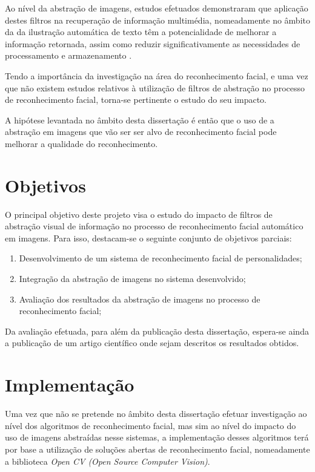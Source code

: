 Ao nível da abstração de imagens, estudos efetuados demonstraram que aplicação destes filtros na recuperação de informação multimédia, nomeadamente no âmbito da da ilustração automática de texto têm a potencialidade de melhorar a informação retornada, assim como reduzir significativamente as necessidades de processamento e armazenamento \citep{Coelho2012}. 

Tendo a importância da investigação na área do reconhecimento facial, e uma vez que não existem estudos relativos à utilização de filtros de abstração no processo de reconhecimento facial, torna-se pertinente o estudo do seu impacto.

A hipótese levantada no âmbito desta dissertação é então que o uso de a abstração em imagens que vão ser ser alvo de reconhecimento facial pode melhorar a qualidade do reconhecimento.

\section{Objetivos} \label{sec:objetivosperpectiva}
O principal objetivo deste projeto visa o estudo do impacto de filtros de abstração visual de informação no processo de reconhecimento facial automático em imagens. Para isso, destacam-se o seguinte conjunto de objetivos parciais:

\begin{enumerate}
\item Desenvolvimento de um sistema de reconhecimento facial de personalidades;
\item Integração da abstração de imagens no sistema desenvolvido;
\item Avaliação dos resultados da abstração de imagens no processo de reconhecimento facial;
\end{enumerate}

Da avaliação efetuada, para além da publicação desta dissertação, espera-se ainda a publicação de um artigo científico onde sejam descritos os resultados obtidos.

\section{Implementação} \label{sec:implementacao}

Uma vez que não se pretende no âmbito desta dissertação efetuar investigação ao nível dos algoritmos de reconhecimento facial, mas sim ao nível do impacto do uso de imagens abstraídas nesse sistemas, a implementação desses algoritmos terá por base a utilização de soluções abertas de reconhecimento facial, nomeadamente a biblioteca \textit{Open CV (Open Source Computer Vision)}.

